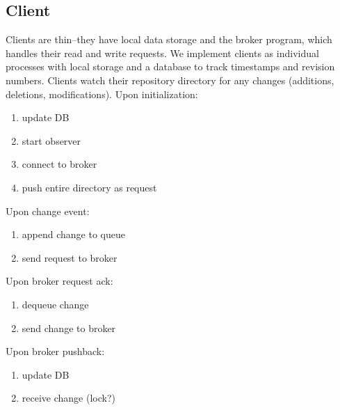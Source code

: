 \subsection{Client}
Clients are thin--they have local data storage and the broker program, which handles their read and write requests.
We implement clients as individual processes with local storage and a database to track timestamps and revision numbers.
Clients watch their repository directory for any changes (additions, deletions, modifications).\newline\newline
Upon initialization:
\begin{enumerate}
\item update DB
\item start observer
\item connect to broker
\item push entire directory as request
\end{enumerate}
Upon change event:
\begin{enumerate}
\item append change to queue
\item send request to broker
\end{enumerate}
Upon broker request ack:
\begin{enumerate}
\item dequeue change
\item send change to broker
\end{enumerate}
Upon broker pushback:
\begin{enumerate}
\item update DB
\item receive change (lock?)
\end{enumerate}

